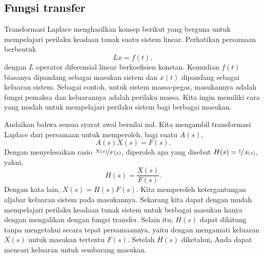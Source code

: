 \subsection{Fungsi transfer}

Transformasi Laplace menghasilkan konsep berikut yang berguna untuk mempelajari
perilaku keadaan tunak suatu sistem linear.  Perhatikan persamaan
berbentuk
\begin{equation*}
L x = f(t) ,
\end{equation*}
dengan $L$ operator diferensial linear berkoefisien konstan.
Kemudian $f(t)$ biasanya dipandang sebagai masukan sistem dan $x(t)$
dipandang sebagai keluaran sistem.  Sebagai contoh, untuk sistem massa-pegas,
masukannya adalah fungsi pemaksa dan keluarannya adalah perilaku
massa.  Kita ingin memiliki cara yang mudah untuk mempelajari perilaku
sistem bagi berbagai masukan.

Andaikan bahwa
semua syarat awal bernilai nol.
Kita mengambil transformasi Laplace dari persamaan untuk memperoleh, bagi suatu $A(s)$,
\begin{equation*}
A(s) X(s) = F(s) .
\end{equation*}
Dengan menyelesaikan rasio $\nicefrac{X(s)}{F(s)}$, diperoleh apa yang disebut
\emph{}
$H(s) = \nicefrac{1}{A(s)}$,
yakni,
\begin{equation*}
H(s) = \frac{X(s)}{F(s)} .
\end{equation*}
Dengan kata lain, $X(s) = H(s) F(s)$.  Kita memperoleh ketergantungan aljabar
keluaran sistem pada masukannya.  Sekarang kita dapat dengan mudah mempelajari
perilaku keadaan tunak sistem untuk berbagai masukan hanya dengan
mengalikan dengan fungsi transfer.
Selain itu, $H(s)$ dapat dihitung tanpa mengetahui secara tepat
persamaannya, yaitu dengan mengamati keluaran $X(s)$ untuk masukan tertentu $F(s)$.
Setelah $H(s)$ diketahui, Anda dapat mencari keluaran untuk sembarang masukan.

